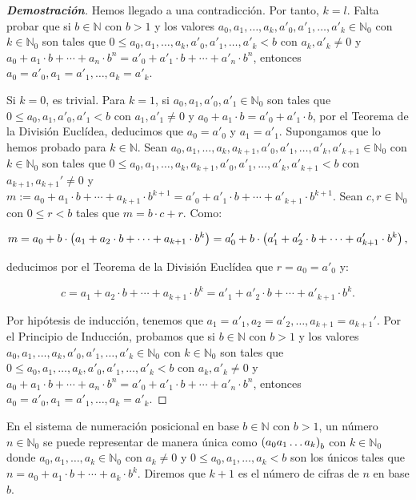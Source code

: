 \begin{theorem}
\begin{proof}[\rm\textbf{Demostración}]
  Hemos llegado a una contradicción. Por tanto, $k=l$. Falta probar que si $b\in\mathbb{N}$ con $b>1$ y los valores $a_0,a_1,\dots,a_k,a'_0,a'_1,\dots,a'_k\in\mathbb{N}_0$ con $k\in\mathbb{N}_0$ son tales que $0\leq a_0,a_1,\dots,a_k,a'_0,a'_1,\dots,a'_k<b$ con $a_k,a'_k\neq 0$ y $a_0+a_1\cdot b+\cdots+a_n\cdot b^n=a'_0+a'_1\cdot b+\cdots+a'_n\cdot b^n$, entonces $a_0=a'_0,a_1=a'_1,\dots,a_k=a'_k$. 
  
  Si $k=0$, es trivial. Para $k=1$, si $a_0,a_1,a'_0,a'_1\in\mathbb{N}_0$ son tales que $0\leq a_0,a_1,a'_0,a'_1<b$ con $a_1,a'_1\neq 0$ y $a_0+a_1\cdot b=a'_0+a'_1\cdot b$, por el Teorema de la División Euclídea, deducimos que $a_0=a'_0$ y $a_1=a'_1$. Supongamos que lo hemos probado para $k\in\mathbb{N}$. Sean $a_0,a_1,\dots,a_k,a_{k+1},a'_0,a'_1,\dots,a'_k,a'_{k+1}\in\mathbb{N}_0$ con $k\in\mathbb{N}_0$ son tales que $0\leq a_0,a_1,\dots,a_k,a_{k+1},a'_0,a'_1,\dots,a'_k,a'_{k+1}<b$ con $a_{k+1},a_{k+1}'\neq 0$ y $m:=a_0+a_1\cdot b+\cdots+a_{k+1}\cdot b^{k+1}=a'_0+a'_1\cdot b+\cdots+a'_{k+1}\cdot b^{k+1}$. Sean $c,r\in\mathbb{N}_0$ con $0\leq r<b$ tales que $m=b\cdot c+r$. Como:

  \begin{equation}
    m=a_0+b\cdot\left(a_1+a_2\cdot b+\cdots+a_{k+1}\cdot b^k\right)=a'_0+b\cdot\left(a'_1+a'_2\cdot b+\cdots+a'_{k+1}\cdot b^k\right),
  \end{equation}

  deducimos por el Teorema de la División Euclídea que $r=a_0=a'_0$ y:

  \begin{equation}
    c=a_1+a_2\cdot b+\cdots+a_{k+1}\cdot b^k=a'_1+a'_2\cdot b+\cdots+a'_{k+1}\cdot b^k.
  \end{equation}

  Por hipótesis de inducción, tenemos que $a_1=a'_1,a_2=a'_2,\dots,a_{k+1}=a_{k+1}'$. Por el Principio de Inducción, probamos que si $b\in\mathbb{N}$ con $b>1$ y los valores $a_0,a_1,\dots,a_k,a'_0,a'_1,\dots,a'_k\in\mathbb{N}_0$ con $k\in\mathbb{N}_0$ son tales que $0\leq a_0,a_1,\dots,a_k,a'_0,a'_1,\dots,a'_k<b$ con $a_k,a'_k\neq 0$ y $a_0+a_1\cdot b+\cdots+a_n\cdot b^n=a'_0+a'_1\cdot b+\cdots+a'_n\cdot b^n$, entonces $a_0=a'_0,a_1=a'_1,\dots,a_k=a'_k$.
  \end{proof}
\end{theorem}

En el sistema de numeración posicional en base $b\in\mathbb{N}$ con $b>1$, un número $n\in\mathbb{N}_0$ se puede representar de manera única como $\left(a_0a_1\dots a_k\right)_b$ con $k\in\mathbb{N}_0$ donde $a_0,a_1,\dots,a_k\in\mathbb{N}_0$ con $a_k\neq 0$ y $0\leq a_0,a_1,\dots,a_k<b$ son los únicos tales que $n=a_0+a_1\cdot b+\cdots+a_k\cdot b^k$. Diremos que $k+1$ es el número de cifras de $n$ en base $b$.

